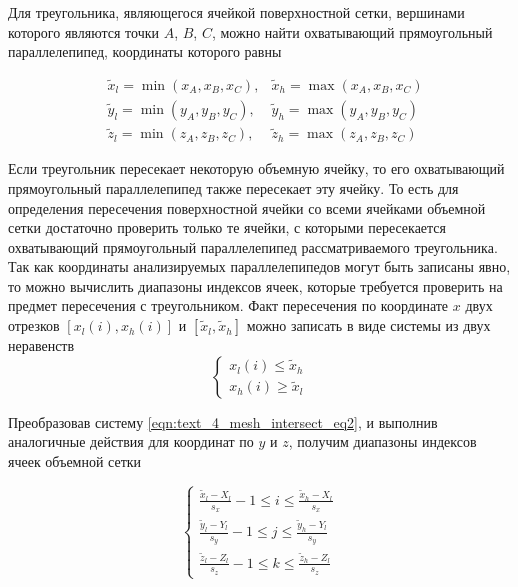 Для треугольника, являющегося ячейкой поверхностной сетки, вершинами которого являются точки $A$, $B$, $C$, можно найти охватывающий прямоугольный параллелепипед, координаты которого равны

\begin{equation}
	\begin{aligned}
		& \tilde{x}_l = \min(x_A, x_B, x_C), & \tilde{x}_h = \max(x_A, x_B, x_C) \\
		& \tilde{y}_l = \min(y_A, y_B, y_C), & \tilde{y}_h = \max(y_A, y_B, y_C) \\
		& \tilde{z}_l = \min(z_A, z_B, z_C), & \tilde{z}_h = \max(z_A, z_B, z_C)
	\end{aligned}
\end{equation}

Если треугольник пересекает некоторую объемную ячейку, то его охватывающий прямоугольный параллелепипед также пересекает эту ячейку.
То есть для определения пересечения поверхностной ячейки со всеми ячейками объемной сетки достаточно проверить только те ячейки, с которыми пересекается охватывающий прямоугольный параллелепипед рассматриваемого треугольника.
Так как координаты анализируемых параллелепипедов могут быть записаны явно, то можно вычислить диапазоны индексов ячеек, которые требуется проверить на предмет пересечения с треугольником.
Факт пересечения по координате $x$ двух отрезков $[x_l(i), x_h(i)]$ и $[\tilde{x}_l, \tilde{x}_h]$ можно записать в виде системы из двух неравенств
\begin{equation}\label{eqn:text_4_mesh_intersect_eq2}
	\left\{
		\begin{aligned}
			x_l(i) \le \tilde{x}_h \\
			x_h(i) \ge \tilde{x}_l
		\end{aligned}
	\right.
\end{equation}

Преобразовав систему \eqref{eqn:text_4_mesh_intersect_eq2}, и выполнив аналогичные действия для координат по $y$ и $z$, получим диапазоны индексов ячеек объемной сетки

\begin{equation}\label{eqn:text_4_mesh_intersect_diap}
	\left\{
		\begin{aligned}
			\frac{\tilde{x}_l - X_l}{s_x} - 1 \le i \le \frac{\tilde{x}_h - X_l}{s_x} \\
			\frac{\tilde{y}_l - Y_l}{s_y} - 1 \le j \le \frac{\tilde{y}_h - Y_l}{s_y} \\
			\frac{\tilde{z}_l - Z_l}{s_z} - 1 \le k \le \frac{\tilde{z}_h - Z_l}{s_z}
		\end{aligned}
	\right.
\end{equation}

